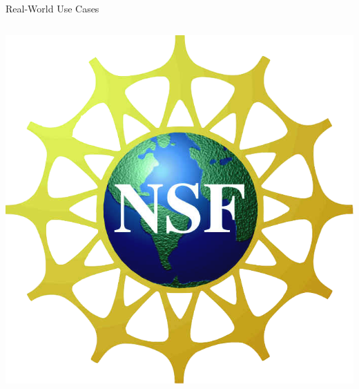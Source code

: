 \documentclass[compress]{beamer}
\begin{document}
\begin{frame}{Real-World Use Cases}
\begin{columns}
  \includegraphics[width=\linewidth]{general_figures/nsf}

\end{columns}

\end{frame}

\begin{frame}[plain]
\vspace*{-1pt}
\end{frame}
\end{document}
